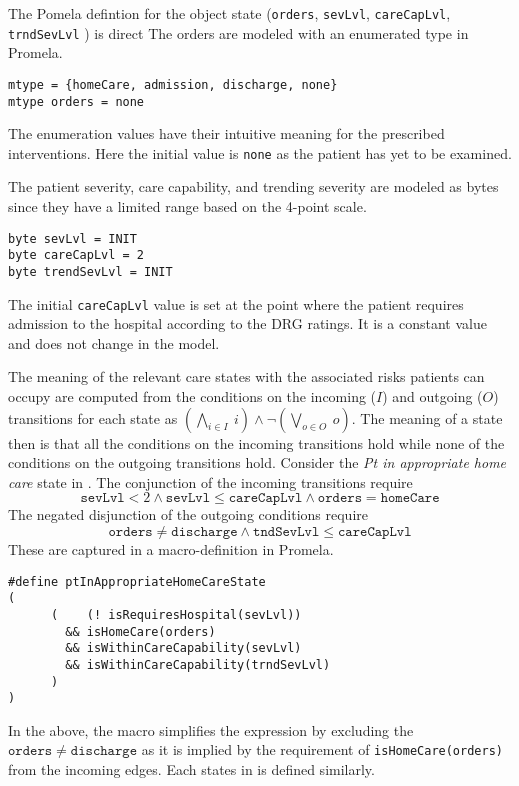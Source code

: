 The Pomela defintion for the object state (\texttt{orders}, \texttt{sevLvl}, \texttt{careCapLvl}, \texttt{trndSevLvl} )  is direct The orders are modeled with an enumerated type in Promela.
%
{\small
\begin{lstlisting}[style=myPromela]
mtype = {homeCare, admission, discharge, none}
mtype orders = none
\end{lstlisting}
}
%
\noindent The enumeration values have their intuitive meaning for the prescribed interventions. Here the initial value is \texttt{none} as the patient has yet to be examined.

The patient severity, care capability, and trending severity are modeled as bytes since they have a limited range based on the 4-point scale.
%
{\small
\begin{lstlisting}[style=myPromela]
byte sevLvl = INIT
byte careCapLvl = 2
byte trendSevLvl = INIT
\end{lstlisting}
}
%
\noindent The initial \texttt{careCapLvl} value is set at the point where the patient requires admission to the hospital according to the DRG ratings. It is a constant value and does not change in the model.

The meaning of the relevant care states with the associated risks patients can occupy are computed from the conditions on the incoming ($I$) and outgoing ($O$) transitions for each state as $(\bigwedge_{i \in I}\ i) \wedge \neg(\bigvee_{o \in O}\ o)$. The meaning of a state then is that all the conditions on the incoming transitions hold while none of the conditions on the outgoing transitions hold. Consider the \emph{Pt in appropriate home care} state in . The conjunction of the incoming transitions require
%
\[
  \mathtt{sevLvl} < 2 \wedge \mathtt{sevLvl} \le \mathtt{careCapLvl} \wedge \mathtt{orders} = \mathtt{homeCare}
\]
%
The negated disjunction of the outgoing conditions require
%
\[
  \mathtt{orders} \neq \mathtt{discharge} \wedge \mathtt{tndSevLvl} \le \mathtt{careCapLvl}
\]
%
\noindent These are captured in a macro-definition in Promela.
%
{\small
\begin{lstlisting}[style=myPromela]
#define ptInAppropriateHomeCareState
(
      (    (! isRequiresHospital(sevLvl))
        && isHomeCare(orders)                                      
        && isWithinCareCapability(sevLvl)
        && isWithinCareCapability(trndSevLvl)
      )
)
\end{lstlisting}
}
%
\noindent In the above, the macro simplifies the expression by excluding the $\mathtt{orders} \neq \mathtt{discharge}$ as it is implied by the requirement of \texttt{isHomeCare(orders)} from the incoming edges. Each states in  is defined similarly.

